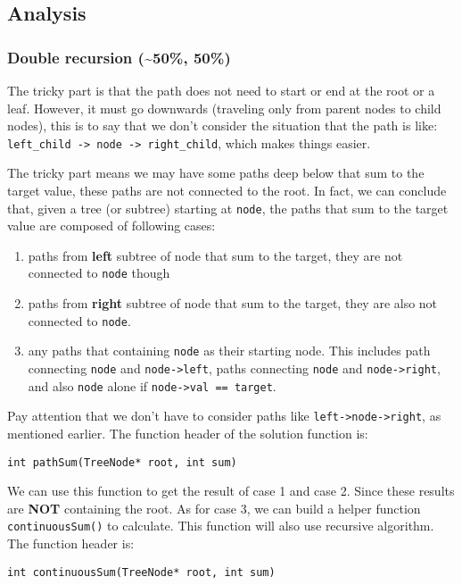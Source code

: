 \documentclass[12pt]{article}
\begin{document}
\subsection{Analysis}
\label{sec:org368395d}
\subsubsection{Double recursion (\textasciitilde{}50\%, 50\%)}
\label{sec:org8ed1d33}
The tricky part is that the path does not need to start or end at the root or a leaf. However, it must go downwards (traveling only from parent nodes to child nodes), this is to say that we don't consider the situation that the path is like: \texttt{left\_child -> node -> right\_child}, which makes things easier.

The tricky part means we may have some paths deep below that sum to the target value, these paths are not connected to the root. In fact, we can conclude that, given a tree (or subtree) starting at \texttt{node}, the paths that sum to the target value are composed of following cases:
\begin{enumerate}
\item paths from \textbf{left} subtree of node that sum to the target, they are not connected to \texttt{node} though
\item paths from \textbf{right} subtree of node that sum to the target, they are also not connected to \texttt{node}.
\item any paths that containing \texttt{node} as their starting node. This includes path connecting \texttt{node} and \texttt{node->left}, paths connecting \texttt{node} and \texttt{node->right}, and also \texttt{node} alone if \texttt{node->val == target}.
\end{enumerate}

Pay attention that we don't have to consider paths like \texttt{left->node->right}, as mentioned earlier. The function header of the solution function is:
\begin{verbatim}
int pathSum(TreeNode* root, int sum)
\end{verbatim}

We can use this function to get the result of case 1 and case 2. Since these results are \textbf{NOT} containing the root. As for case 3, we can build a helper function \texttt{continuousSum()} to calculate. This function will also use recursive algorithm. The function header is:
\begin{verbatim}
int continuousSum(TreeNode* root, int sum)
\end{verbatim}
\end{document}
